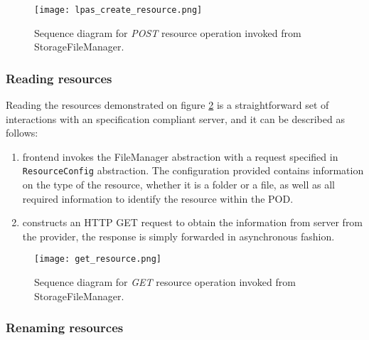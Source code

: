 \begin{figure}[h]
\centering
\texttt{[image: lpas\_create\_resource.png]}
\caption{Sequence diagram for \textit{POST} resource operation invoked from StorageFileManager.}
\label{fig:lpas_create_resource}
\end{figure}

\subsubsection{Reading resources}
Reading the resources demonstrated on figure \ref{fig:lps_get_resource_sequence} is a straightforward set of interactions with an \solid{} specification compliant server, and it can be described as follows:

\begin{enumerate}
    \item \lpa{} frontend invokes the FileManager abstraction with a request specified in \texttt{ResourceConfig} abstraction. The configuration provided contains information on the type of the resource, whether it is a folder or a file, as well as all required information to identify the resource within the POD.
    \item \lpas{} constructs an HTTP GET request to obtain the information from \solid{} server from the provider, the response is simply forwarded in asynchronous fashion.
\end{enumerate}

 
\begin{figure}[h]
\centering
\texttt{[image: get\_resource.png]}
\caption{Sequence diagram for \textit{GET} resource operation invoked from StorageFileManager.}
\label{fig:lps_get_resource_sequence}
\end{figure}

\subsubsection{Renaming resources}

